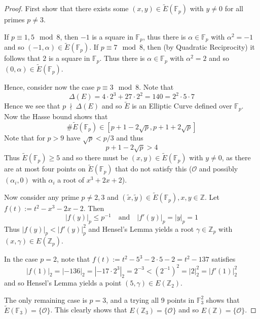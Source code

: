 \documentclass{scrartcl}
\newcommand{\Z}{\mathbb{Z}}
\newcommand{\F}{\mathbb{F}}
\renewcommand{\O}{\mathcal{O}}
\newcommand{\notdivides}{\ \nmid \ }
\theoremstyle{definition}
\begin{document}
\begin{proof}
    First show that there exists some $(x, y) \in \tilde{E}(\F_p)$ with $y \neq 0$ for all primes $p \neq 3$.

    If $p \equiv 1, 5 \mod 8$, then $-1$ is a square in $\F_p$, thus there is $\alpha \in \F_p$ with $\alpha^2 = -1$ and so $(-1, \alpha) \in \tilde{E}(\F_p)$.
    If $p \equiv 7 \mod 8$, then (by Quadratic Reciprocity) it follows that $2$ is a square in $\F_p$.
    Thus there is $\alpha \in \F_p$ with $\alpha^2 = 2$ and so $(0, \alpha) \in \tilde{E}(\F_p)$.

    Hence, consider now the case $p \equiv 3 \mod 8$.
    Note that
    \begin{equation*}
        \Delta(E) = 4 \cdot 2^3 + 27 \cdot 2^2 = 140 = 2^2 \cdot 5 \cdot 7
    \end{equation*}
    Hence we see that $p \notdivides \Delta(E)$ and so $\tilde{E}$ is an Elliptic Curve defined over $\F_p$.
    Now the Hasse bound shows that
    \begin{equation*}
        \#\tilde{E}(\F_p) \in [p + 1 - 2\sqrt{p}, p + 1 + 2\sqrt{p}]
    \end{equation*}
    Note that for $p > 9$ have $\sqrt{p} < p/3$ and thus
    \begin{equation*}
        p + 1 - 2\sqrt{p} > 4
    \end{equation*}
    Thus $\tilde{E}(\F_p) \geq 5$ and so there must be $(x, y) \in \tilde{E}(\F_p)$ with $y \neq 0$, as there are at most four points on $\tilde{E}(\F_p)$ that do not satisfy this ($\O$ and possibly $(\alpha_i, 0)$ with $\alpha_i$ a root of $x^3 + 2x + 2$).

    Now consider any prime $p \neq 2, 3$ and $(\tilde{x}, \tilde{y}) \in \tilde{E}(\F_p), x, y \in \Z$.
    Let $f(t) := t^2 - x^3 - 2x - 2$.
    Then
    \begin{equation*}
        |f(y)|_p \leq p^{-1} \quad \text{and} \quad |f'(y)|_p = |y|_p = 1
    \end{equation*}
    Thus $|f(y)|_p < |f'(y)|_p^2$ and Hensel's Lemma yields a root $\gamma \in \Z_p$ with $(x, \gamma) \in E(\Z_p)$.

    In the case $p = 2$, note that $f(t) := t^2 - 5^3 - 2 \cdot 5 - 2 = t^2 - 137$ satisfies
    \begin{equation*}
        |f(1)|_2 = |-136|_2 = |-17 \cdot 2^3|_2 = 2^{-3} < \left( 2^{-1} \right)^2 = |2|_2^2 = |f'(1)|_2^2
    \end{equation*}
    and so Hensel's Lemma yields a point $(5, \gamma) \in E(\Z_2)$.

    The only remaining case is $p = 3$, and a trying all 9 points in $\F_3^2$ shows that $\tilde{E}(\F_3) = \{\O\}$.
    This clearly shows that $E(\Z_3) = \{ \O \}$ and so $E(\Z) = \{\O\}$.
\end{proof}
\end{document}
